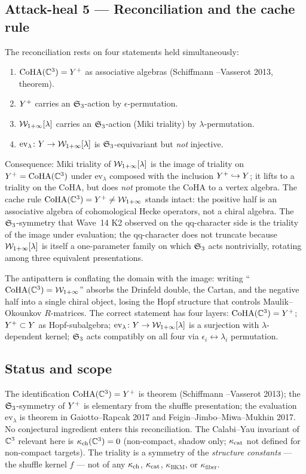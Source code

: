 \subsection*{Attack-heal 5 --- Reconciliation and the cache rule}

The reconciliation rests on four statements held simultaneously:
\begin{enumerate}
\item $\mathrm{CoHA}(\mathbb{C}^{3}) = Y^{+}$ as associative algebras (Schiffmann
      --Vasserot 2013, theorem).
\item $Y^{+}$ carries an $\mathfrak{S}_{3}$-action by $\epsilon$-permutation.
\item $\mathcal{W}_{1+\infty}[\lambda]$ carries an $\mathfrak{S}_{3}$-action (Miki triality) by
      $\lambda$-permutation.
\item $\mathrm{ev}_{\lambda}\colon Y \to \mathcal{W}_{1+\infty}[\lambda]$ is
      $\mathfrak{S}_{3}$-equivariant but \emph{not} injective.
\end{enumerate}
Consequence: Miki triality of $\mathcal{W}_{1+\infty}[\lambda]$ is the image of
triality on $Y^{+} = \mathrm{CoHA}(\mathbb{C}^{3})$ under $\mathrm{ev}_{\lambda}$
composed with the inclusion $Y^{+} \hookrightarrow Y$; it lifts to a
triality on the CoHA, but does \emph{not} promote the CoHA to a vertex
algebra.  The cache rule $\mathrm{CoHA}(\mathbb{C}^{3}) = Y^{+} \neq \mathcal{W}_{1+\infty}$ stands
intact: the positive half is an associative algebra of cohomological
Hecke operators, not a chiral algebra.  The $\mathfrak{S}_{3}$-symmetry that
Wave~14 K2 observed on the qq-character side is the triality of the
image under evaluation; the qq-character does not truncate because
$\mathcal{W}_{1+\infty}[\lambda]$ is itself a one-parameter family on which $\mathfrak{S}_{3}$
acts nontrivially, rotating among three equivalent presentations.

The antipattern is conflating the domain with the image: writing
``$\mathrm{CoHA}(\mathbb{C}^{3}) = \mathcal{W}_{1+\infty}$'' absorbs the Drinfeld double, the
Cartan, and the negative half into a single chiral object, losing
the Hopf structure that controls Maulik--Okounkov $R$-matrices.  The
correct statement has four layers: $\mathrm{CoHA}(\mathbb{C}^{3}) = Y^{+}$;
$Y^{+} \subset Y$ as Hopf-subalgebra; $\mathrm{ev}_{\lambda}\colon Y
\to \mathcal{W}_{1+\infty}[\lambda]$ is a surjection with $\lambda$-dependent kernel;
$\mathfrak{S}_{3}$ acts compatibly on all four via $\epsilon_{i} \leftrightarrow
\lambda_{i}$ permutation.

\subsection*{Status and scope}

The identification $\mathrm{CoHA}(\mathbb{C}^{3}) = Y^{+}$ is theorem (Schiffmann
--Vasserot 2013); the $\mathfrak{S}_{3}$-symmetry of $Y^{+}$ is elementary
from the shuffle presentation; the evaluation $\mathrm{ev}_{\lambda}$
is theorem in Gaiotto--Rapcak 2017 and Feigin--Jimbo--Miwa--Mukhin
2017.  No conjectural ingredient enters this reconciliation.  The
Calabi--Yau invariant of $\mathbb{C}^{3}$ relevant here is
$\kappa_{\mathrm{ch}}(\mathbb{C}^{3}) = 0$ (non-compact, shadow only;
$\kappa_{\mathrm{cat}}$ not defined for non-compact targets).  The triality is a
symmetry of the \emph{structure constants} --- the shuffle kernel $f$
--- not of any $\kappa_{\mathrm{ch}}$, $\kappa_{\mathrm{cat}}$, $\kappa_{\mathrm{BKM}}$, or $\kappa_{\mathrm{fiber}}$.
